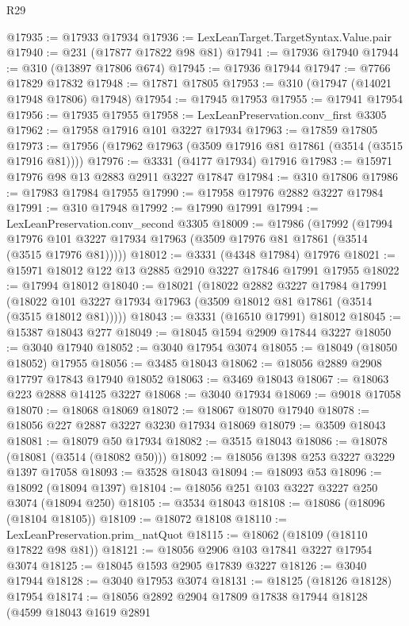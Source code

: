 \begin{lexlean}{R29}
\begin{coremodule}
@17935 := @17933 @17934
@17936 := LexLeanTarget.TargetSyntax.Value.pair
@17940 := @231 (@17877 @17822 @98 @81)
@17941 := @17936 @17940
@17944 := @310 (@13897 @17806 @674)
@17945 := @17936 @17944
@17947 := @7766 @17829 @17832
@17948 := @17871 @17805
@17953 := @310 (@17947 (@14021 @17948 @17806) @17948)
@17954 := @17945 @17953
@17955 := @17941 @17954
@17956 := @17935 @17955
@17958 := LexLeanPreservation.conv_first @3305
@17962 := @17958 @17916 @101 @3227 @17934
@17963 := @17859 @17805
@17973 := @17956 (@17962 @17963 (@3509 @17916 @81 @17861 (@3514 (@3515 @17916 @81))))
@17976 := @3331 (@4177 @17934) @17916
@17983 := @15971 @17976 @98 @13 @2883 @2911 @3227 @17847
@17984 := @310 @17806
@17986 := @17983 @17984 @17955
@17990 := @17958 @17976 @2882 @3227 @17984
@17991 := @310 @17948
@17992 := @17990 @17991
@17994 := LexLeanPreservation.conv_second @3305
@18009 := @17986
    (@17992
      (@17994 @17976 @101 @3227 @17934 @17963 (@3509 @17976 @81 @17861 (@3514 (@3515 @17976 @81)))))
@18012 := @3331 (@4348 @17984) @17976
@18021 := @15971 @18012 @122 @13 @2885 @2910 @3227 @17846 @17991 @17955
@18022 := @17994 @18012
@18040 := @18021
    (@18022
      @2882
      @3227
      @17984
      @17991
      (@18022 @101 @3227 @17934 @17963 (@3509 @18012 @81 @17861 (@3514 (@3515 @18012 @81)))))
@18043 := @3331 (@16510 @17991) @18012
@18045 := @15387 @18043 @277
@18049 := @18045 @1594 @2909 @17844 @3227
@18050 := @3040 @17940
@18052 := @3040 @17954 @3074
@18055 := @18049 (@18050 @18052) @17955
@18056 := @3485 @18043
@18062 := @18056 @2889 @2908 @17797 @17843 @17940 @18052
@18063 := @3469 @18043
@18067 := @18063 @223 @2888 @14125 @3227
@18068 := @3040 @17934
@18069 := @9018 @17058
@18070 := @18068 @18069
@18072 := @18067 @18070 @17940
@18078 := @18056 @227 @2887 @3227 @3230 @17934 @18069
@18079 := @3509 @18043
@18081 := @18079 @50 @17934
@18082 := @3515 @18043
@18086 := @18078 (@18081 (@3514 (@18082 @50)))
@18092 := @18056 @1398 @253 @3227 @3229 @1397 @17058
@18093 := @3528 @18043
@18094 := @18093 @53
@18096 := @18092 (@18094 @1397)
@18104 := @18056 @251 @103 @3227 @3227 @250 @3074 (@18094 @250)
@18105 := @3534 @18043
@18108 := @18086 (@18096 (@18104 @18105))
@18109 := @18072 @18108
@18110 := LexLeanPreservation.prim_natQuot
@18115 := @18062 (@18109 (@18110 @17822 @98 @81))
@18121 := @18056 @2906 @103 @17841 @3227 @17954 @3074
@18125 := @18045 @1593 @2905 @17839 @3227
@18126 := @3040 @17944
@18128 := @3040 @17953 @3074
@18131 := @18125 (@18126 @18128) @17954
@18174 := @18056
    @2892
    @2904
    @17809
    @17838
    @17944
    @18128
    (@4599
      @18043
      @1619
      @2891

\end{coremodule}
\end{lexlean}
